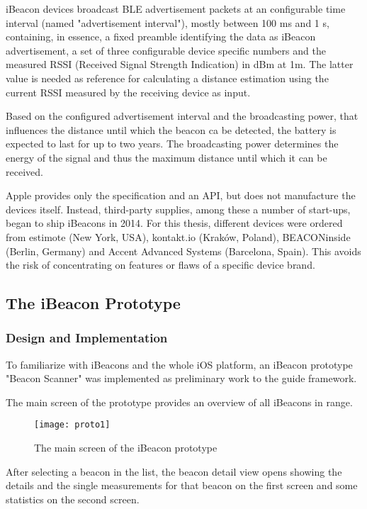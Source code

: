 iBeacon devices broadcast BLE advertisement packets at an configurable time interval (named "advertisement interval"), mostly between 100 ms and 1 s, containing, in essence, a fixed preamble identifying the data as iBeacon advertisement, a set of three configurable device specific numbers and the measured RSSI (Received Signal Strength Indication) in dBm at 1m. The latter value is needed as reference for calculating a distance estimation using the current RSSI measured by the receiving device as input.

Based on the configured advertisement interval and the broadcasting power, that influences the distance until which the beacon ca be detected, the battery is expected to last for up to two years. The broadcasting power determines the energy of the signal and thus the maximum distance until which it can be received.

Apple provides only the specification and an API, but does not manufacture the devices itself. Instead, third-party supplies, among these a number of start-ups, began to ship iBeacons in 2014. For this thesis, different devices were ordered from estimote (New York, USA), kontakt.io (Kraków, Poland), BEACONinside (Berlin, Germany) and Accent Advanced Systems (Barcelona, Spain). This avoids the risk of concentrating on features or flaws of a specific device brand.

\subsection{The iBeacon Prototype}

\label{prototype}

\subsubsection{Design and Implementation}

To familiarize with iBeacons and the whole iOS platform, an iBeacon prototype "Beacon Scanner" was implemented as preliminary work to the guide framework.

The main screen of the prototype provides an overview of all iBeacons in range. %

\begin{figure}[H]
\centering
\texttt{[image: proto1]}
\caption{The main screen of the iBeacon prototype}
\end{figure}

After selecting a beacon in the list, the beacon detail view opens showing the details and the single measurements for that beacon on the first screen and some statistics on the second screen.

